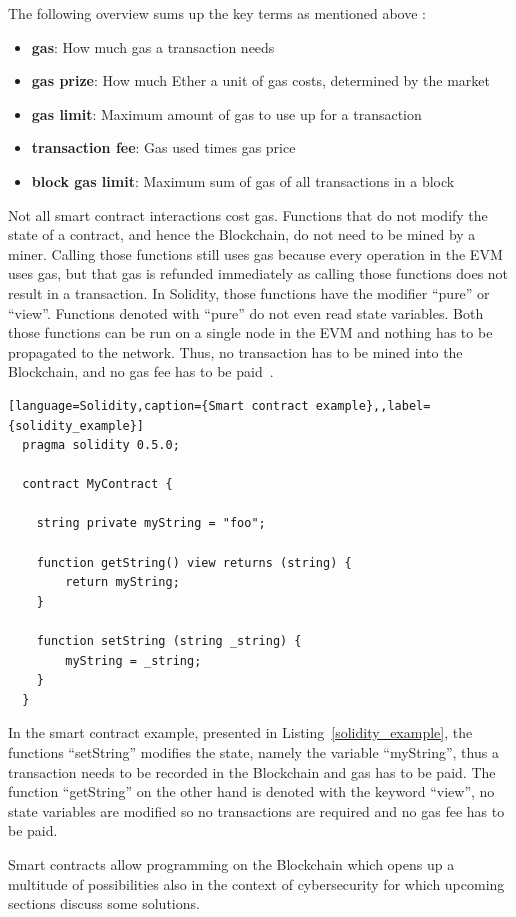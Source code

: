 The following overview sums up the key terms as mentioned above \cite{blockgeeks}:
\begin{itemize}
  \item {\textbf{gas}: How much gas a transaction needs }
  \item {\textbf{gas prize}: How much Ether a unit of gas costs, determined by the market}
  \item {\textbf{gas limit}: Maximum amount of gas to use up for a transaction}
  \item {\textbf{transaction fee}: Gas used times gas price}
  \item {\textbf{block gas limit}: Maximum sum of gas of all transactions in a block}

\end{itemize}

Not all smart contract interactions cost gas. Functions that do not modify the state of a contract, and hence the Blockchain, do not need to be mined by a miner.
Calling those functions still uses gas because every operation in the EVM uses gas, but that gas is refunded immediately as calling those functions does not result in a transaction.
In Solidity, those functions have the modifier ``pure'' or ``view''. Functions denoted with ``pure'' do not even read state variables. Both those functions can be run on a single node in the EVM and
nothing has to be propagated to the network. Thus, no transaction has to be mined into the Blockchain, and no gas fee has to be paid~\cite{blockgeeks}.

\begin{lstlisting}[language=Solidity,caption={Smart contract example},,label={solidity_example}]
  pragma solidity 0.5.0;

  contract MyContract {

    string private myString = "foo";

    function getString() view returns (string) {
        return myString;
    }

    function setString (string _string) {
        myString = _string;
    }
  }
  \end{lstlisting}

In the smart contract example, presented in Listing~\ref{solidity_example}, the functions ``setString'' modifies the state, namely the variable ``myString'', thus a transaction needs to be recorded in the Blockchain and gas has to be paid.
The function ``getString'' on the other hand is denoted with the keyword ``view'', no state variables are modified so no transactions are required and no gas fee has to be paid.

Smart contracts allow programming on the Blockchain which opens up a multitude of possibilities also in the context of cybersecurity for which upcoming sections discuss some solutions.
